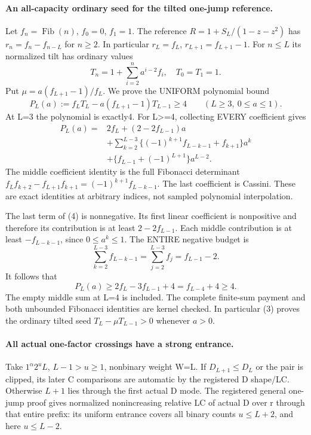 \paragraph{An all-capacity ordinary seed for the tilted one-jump reference.}
Let $f_n=\operatorname{Fib}(n)$, $f_0=0$, $f_1=1$.
The reference $R=1+S_L/(1-z-z^2)$ has
$r_n=f_n-f_{n-L}$ for $n\ge2$.
In particular $r_L=f_L$, $r_{L+1}=f_{L+1}-1$.
For $n\le L$ its normalized tilt has ordinary values
\[
 T_n=1+\sum_{i=2}^n a^{i-2}f_i,\quad T_0=T_1=1.
\]
Put $\mu=a(f_{L+1}-1)/f_L$. We prove the UNIFORM polynomial bound
\[
 P_L(a):=f_LT_L-a(f_{L+1}-1)T_{L-1}\ge4
                   \qquad(L\ge3,\ 0\le a\le1).       \tag{3}
\]
At L=3 the polynomial is exactly4. For L>=4, collecting EVERY
coefficient gives
\[
\begin{split}
 P_L(a)={}&2f_L+(2-2f_{L-1})a\\
 &+\sum_{k=2}^{L-3}
 \{(-1)^{k+1}f_{L-k-1}+f_{k+1}\}a^k\\
 &+\{f_{L-1}+(-1)^{L+1}\}a^{L-2}.                  \tag{4}
\end{split}
\]
The middle coefficient identity is the full Fibonacci determinant
$f_Lf_{k+2}-f_{L+1}f_{k+1}=(-1)^{k+1}f_{L-k-1}$.
The last coefficient is Cassini. These are exact identities at
arbitrary indices, not sampled polynomial interpolation.

The last term of (4) is nonnegative. Its first linear coefficient
is nonpositive and therefore its contribution is at least
$2-2f_{L-1}$. Each middle contribution is at least $-f_{L-k-1}$,
since $0\le a^k\le1$. The ENTIRE negative budget is
\[
 \sum_{k=2}^{L-3}f_{L-k-1}
       =\sum_{j=2}^{L-3}f_j=f_{L-1}-2.
\]
It follows that
\[
 P_L(a)\ge2f_L-3f_{L-1}+4=f_{L-4}+4\ge4.
\]
The empty middle sum at L=4 is included. The complete finite-sum
payment and both unbounded Fibonacci identities are kernel checked.
In particular (3) proves the ordinary tilted seed
$T_L-\mu T_{L-1}>0$ whenever $a>0$.

\paragraph{All actual one-factor crossings have a strong entrance.}
Take $1^\alpha2^uL$, $L-1>u\ge1$, nonbinary weight W=L.
If $D_{L+1}\le D_L$ or the pair is clipped, its later C comparisons
are automatic by the registered D shape/LC.
Otherwise $L+1$ lies through the first actual D mode.
The registered general one-jump proof gives normalized nonincreasing
relative LC of actual D over r through that entire prefix:
its uniform entrance covers all binary counts $u\le L+2$,
and here $u\le L-2$.

